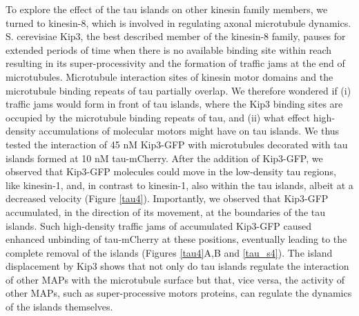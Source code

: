 To explore the effect of the tau islands on other kinesin family members, we turned to kinesin-8, which is involved in regulating axonal microtubule dynamics\parencite{KEVENAAR2016849}. S. cerevisiae Kip3, the best described member of the kinesin-8 family, pauses for extended periods of time when there is no available binding site within reach\parencite{Varga2009} resulting in its super-processivity\parencite{Varga2006} and the formation of traffic jams at the end of microtubules\parencite{Leduc2012}. Microtubule interaction sites of kinesin motor domains and the microtubule binding repeats of tau partially overlap\parencite{Kellogg2018}. We therefore wondered if (i) traffic jams would form in front of tau islands, where the Kip3 binding sites are occupied by the microtubule binding repeats of tau, and (ii) what effect high-density accumulations of molecular motors might have on tau islands. We thus tested the interaction of 45 nM Kip3-GFP with microtubules decorated with tau islands formed at 10 nM tau-mCherry. After the addition of Kip3-GFP, we observed that Kip3-GFP molecules could move in the low-density tau regions, like kinesin-1, and, in contrast to kinesin-1, also within the tau islands, albeit at a decreased velocity (Figure \ref{tau4}). Importantly, we observed that Kip3-GFP accumulated, in the direction of its movement, at the boundaries of the tau islands. Such high-density traffic jams of accumulated Kip3-GFP caused enhanced unbinding of tau-mCherry at these positions, eventually leading to the complete removal of the islands (Figures \ref{tau4}A,B and \ref{tau_s4}). The island displacement by Kip3 shows that not only do tau islands regulate the interaction of other MAPs with the microtubule surface but that, vice versa, the activity of other MAPs, such as super-processive motors proteins, can regulate the dynamics of the islands themselves.

